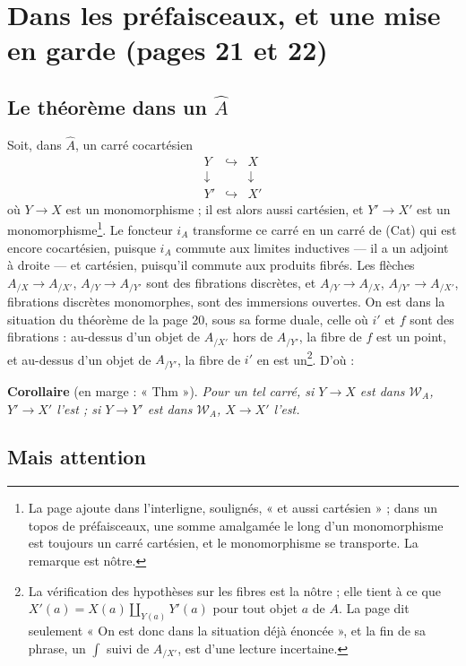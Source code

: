 \documentclass[11pt,a4paper]{article}
\begin{document}
\section*{Dans les préfaisceaux, et une mise en garde (pages 21 et 22)}

\subsection*{Le théorème dans un $\widehat{A}$}

Soit, dans $\widehat{A}$, un carré cocartésien
\[
\begin{array}{ccc}
Y & \hookrightarrow & X \\
\downarrow & & \downarrow \\
Y' & \hookrightarrow & X'
\end{array}
\]
où $Y \to X$ est un monomorphisme ; il est alors aussi cartésien, et
$Y' \to X'$ est un monomorphisme\footnote{La page ajoute dans l'interligne,
soulignés, « et aussi cartésien » ; dans un topos de préfaisceaux, une somme
amalgamée le long d'un monomorphisme est toujours un carré cartésien, et le
monomorphisme se transporte. La remarque est nôtre.}. Le foncteur $i_{A}$
transforme ce carré en un carré de (Cat) qui est encore cocartésien, puisque
$i_{A}$ commute aux limites inductives --- il a un adjoint à droite --- et
cartésien, puisqu'il commute aux produits fibrés. Les flèches
$A_{/X} \to A_{/X'}$, $A_{/Y} \to A_{/Y'}$ sont des fibrations discrètes, et
$A_{/Y} \to A_{/X}$, $A_{/Y'} \to A_{/X'}$, fibrations discrètes monomorphes,
sont des immersions ouvertes. On est dans la situation du théorème de la page
20, sous sa forme duale, celle où $i'$ et $f$ sont des fibrations : au-dessus
d'un objet de $A_{/X'}$ hors de $A_{/Y'}$, la fibre de $f$ est un point, et
au-dessus d'un objet de $A_{/Y'}$, la fibre de $i'$ en est un\footnote{La
vérification des hypothèses sur les fibres est la nôtre ; elle tient à ce
que $X'(a) = X(a) \amalg_{Y(a)} Y'(a)$ pour tout objet $a$ de $A$. La page dit
seulement « On est donc dans la situation déjà énoncée », et la fin de sa
phrase, un $\int$ suivi de $A_{/X'}$, est d'une lecture incertaine.}. D'où :

\textbf{Corollaire} (en marge : « Thm »). \emph{Pour un tel carré, si
$Y \to X$ est dans $\mathcal{W}_{A}$, $Y' \to X'$ l'est ; si $Y \to Y'$ est
dans $\mathcal{W}_{A}$, $X \to X'$ l'est.}

\subsection*{Mais attention}
\end{document}

